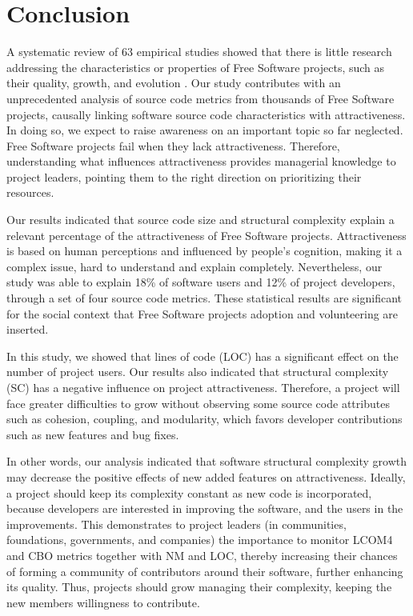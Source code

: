 \documentclass[conference]{IEEEtran}
\begin{document}
\section{Conclusion}
\label{conclusion}

A systematic review of 63 empirical studies showed that there is little research
addressing the characteristics or properties of Free Software projects,
such as their quality, growth, and evolution \cite{Stol2009}.
%
Our study contributes with an unprecedented analysis of
source code metrics from thousands of Free Software projects,
causally linking software source code characteristics with attractiveness.
%
In doing so, we expect to raise awareness on an important topic so far
neglected. Free Software projects fail when they lack attractiveness.
Therefore, understanding what influences attractiveness provides
managerial knowledge to project leaders, pointing them to the right
direction on prioritizing their resources.

Our results indicated that source code size and structural complexity
explain a relevant percentage of the attractiveness of Free Software projects.
%
Attractiveness is based on human perceptions and influenced by people's
cognition, making it a complex issue, hard to understand and explain
completely.
%
Nevertheless, our study was able to explain 18\% of software
users and 12\% of project developers, through a set of four source code metrics.
%
These statistical results are significant for the social context that
Free Software projects adoption and volunteering are inserted.

In this study, we showed that lines of code (LOC)
has a significant effect on the number of project users.
%
Our results also indicated that structural complexity (SC) has a negative
influence on project attractiveness.
%
Therefore, a project will face greater difficulties to grow without observing
some source code attributes such as cohesion, coupling, and modularity,
which favors developer contributions such as new features and bug fixes.

In other words, our analysis indicated that software structural complexity growth
may decrease the positive effects of new added features on attractiveness.
%
Ideally, a project should keep its complexity constant as new code is incorporated,
because developers are interested in improving the software, and the users in the improvements.
%
This demonstrates to project leaders (in communities, foundations,
governments, and companies)
the importance to monitor LCOM4 and CBO metrics together with NM and LOC,
thereby increasing their chances of forming a community of contributors
around their software, further enhancing its quality.
Thus, projects should grow managing their complexity, keeping the new
members willingness to contribute.
\end{document}
